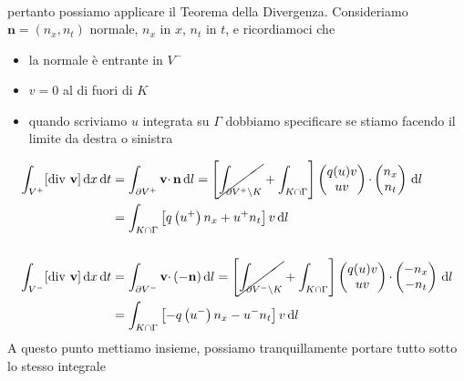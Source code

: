 \documentclass[10pt,a4paper,twoside,openright]{book}
\newcommand{\de}{\,\mathrm d}
\newcommand{\dx}{\de x}
\newcommand{\dl}{\de l}
\newcommand{\dt}{\de t}
\begin{document}
\begin{dimostrazione}
\begin{gather*}
	\end{gather*}
	pertanto possiamo applicare il Teorema della Divergenza. Consideriamo $\mathbf{n} =(n_{x} ,n_{t})$ normale, $n_{x}$ in $x$, $n_{t}$ in $t$, e ricordiamoci che
	\begin{itemize}
		\item la normale è entrante in $V^{-}$
		\item $v=0$ al di fuori di $K$
		\item quando scriviamo $u$ integrata su $\Gamma $ dobbiamo specificare se stiamo facendo il limite da destra o sinistra
	\end{itemize}
	\begin{align*}
		\int _{V^{+}}[\mathrm{div} \ \mathbf{v}] \dx\dt & =\int _{\partial V^{+}}\mathbf{v} \cdotp \mathbf{n} \dl=\left[\cancel{\int _{\partial V^{+} \setminus K}} +\int _{K\cap \Gamma }\right]     
		\begin{pmatrix}
		q(u) v\\
		uv
		\end{pmatrix} \cdotp 
		\begin{pmatrix}
		n_{x}\\
		n_{t}
		\end{pmatrix} \dl\\
		                                                & =\int _{K\cap \Gamma }\left[ q\left(u^{+}\right) n_{x} +u^{+} n_{t}\right] v\dl                                                            \\
		                                                &                                                                                                                                              \\
		\int _{V^{-}}[\mathrm{div} \ \mathbf{v}] \dx\dt & =\int _{\partial V^{-}}\mathbf{v} \cdotp (-\mathbf{n}) \dl=\left[\cancel{\int _{\partial V^{-} \setminus K}} +\int _{K\cap \Gamma }\right] 
		\begin{pmatrix}
		q(u) v\\
		uv
		\end{pmatrix} \cdotp 
		\begin{pmatrix}
		-n_{x}\\
		-n_{t}
		\end{pmatrix} \dl\\
		                                                & =\int _{K\cap \Gamma }\left[ -q\left(u^{-}\right) n_{x} -u^{-} n_{t}\right] v\dl                                                           
	\end{align*}
	A questo punto mettiamo insieme, possiamo tranquillamente portare tutto sotto lo stesso integrale

\end{dimostrazione}
\end{document}
